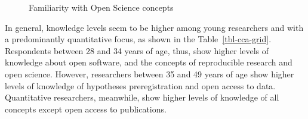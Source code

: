 \documentclass[
  letterpaper,
]{article}
\begin{document}
\begin{figure}


\caption{\label{fig-cca}Familiarity with Open Science concepts}

\end{figure}%

In general, knowledge levels seem to be higher among young researchers
and with a predominantly quantitative focus, as shown in the
Table~\ref{tbl-cca-grid}. Respondents between 28 and 34 years of age,
thus, show higher levels of knowledge about open software, and the
concepts of reproducible research and open science. However, researchers
between 35 and 49 years of age show higher levels of knowledge of
hypotheses preregistration and open access to data. Quantitative
researchers, meanwhile, show higher levels of knowledge of all concepts
except open access to publications.
\end{document}
